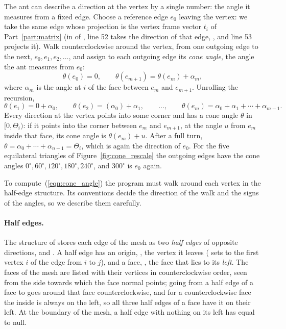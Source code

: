 The ant can describe a direction at the vertex by a single number: the angle it measures from a fixed edge. Choose a reference edge $e_0$ leaving the vertex: we take the same edge  whose projection is the vertex frame vector $t_i$ of Part~\ref{part:matrix} (in  of , line 52 takes the direction of that edge, , and line 53 projects it). Walk counterclockwise around the vertex, from one outgoing edge to the next, $e_0, e_1, e_2, \ldots$, and assign to each outgoing edge its \emph{cone angle}, the angle the ant measures from $e_0$:
\begin{equation}
\label{eqn:cone_angle}
\theta(e_0) = 0, \qquad \theta(e_{m+1}) = \theta(e_m) + \alpha_m ,
\end{equation}
where $\alpha_m$ is the angle at $i$ of the face between $e_m$ and $e_{m+1}$. Unrolling the recursion,
\begin{equation*}
\theta(e_1) = 0 + \alpha_0, \qquad \theta(e_2) = (\alpha_0) + \alpha_1, \qquad \ldots, \qquad \theta(e_m) = \alpha_0 + \alpha_1 + \cdots + \alpha_{m-1} .
\end{equation*}
Every direction at the vertex points into some corner and has a cone angle $\theta$ in $[0, \Theta_i)$: if it points into the corner between $e_m$ and $e_{m+1}$, at the angle $u$ from $e_m$ inside that face, its cone angle is $\theta(e_m) + u$. After a full turn, $\theta = \alpha_0 + \cdots + \alpha_{n-1} = \Theta_i$, which is again the direction of $e_0$. For the five equilateral triangles of Figure~\ref{fig:cone_rescale} the outgoing edges have the cone angles $0^\circ, 60^\circ, 120^\circ, 180^\circ, 240^\circ$, and $300^\circ$ is $e_0$ again.

To compute~(\ref{eqn:cone_angle}) the program must walk around each vertex in the half-edge structure. Its conventions decide the direction of the walk and the signs of the angles, so we describe them carefully.

\paragraph{Half edges.} The structure of  stores each edge of the mesh as two \emph{half edges} of opposite directions,  and . A half edge has an origin, , the vertex it leaves ( sets  to the first vertex $i$ of the edge from $i$ to $j$), and a face, , the face that lies to its \emph{left}. The faces of the mesh are listed with their vertices in counterclockwise order, seen from the side towards which the face normal points; going from a half edge of a face to  goes around that face counterclockwise, and for a counterclockwise face the inside is always on the left, so all three half edges of a face have it on their left. At the boundary of the mesh, a half edge with nothing on its left has  equal to null.

